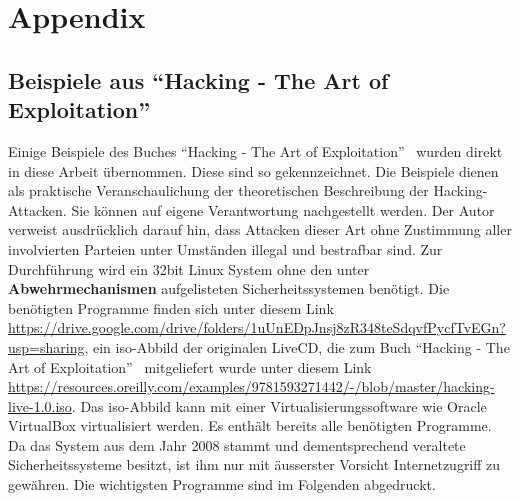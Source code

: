 \documentclass[11pt, a4paper]{article}
\begin{document}
\section{Appendix}
\subsection{Beispiele aus ``Hacking - The Art of Exploitation''}\label{subsec:beispiele}
Einige Beispiele des Buches ``Hacking - The Art of Exploitation''~\cite{erickson2008hacking} wurden direkt in diese Arbeit übernommen. Diese sind so gekennzeichnet. Die Beispiele dienen als praktische Veranschaulichung der theoretischen Beschreibung der Hacking-Attacken. Sie können auf eigene Verantwortung nachgestellt werden. Der Autor verweist ausdrücklich darauf hin, dass Attacken dieser Art ohne Zustimmung aller involvierten Parteien unter Umständen illegal und bestrafbar sind. Zur Durchführung wird ein 32bit Linux System ohne den unter \textbf{Abwehrmechanismen} aufgelisteten Sicherheitssystemen benötigt. Die benötigten Programme finden sich unter diesem Link \url{https://drive.google.com/drive/folders/1uUnEDpJnsj8zR348teSdqvfPycfTvEGn?usp=sharing}, ein \gls{iso}-Abbild der originalen LiveCD, die zum Buch ``Hacking - The Art of Exploitation''~\cite{erickson2008hacking} mitgeliefert wurde unter diesem Link \url{https://resources.oreilly.com/examples/9781593271442/-/blob/master/hacking-live-1.0.iso}. Das \gls{iso}-Abbild kann mit einer Virtualisierungssoftware wie Oracle VirtualBox virtualisiert werden. Es enthält bereits alle benötigten Programme. Da das System aus dem Jahr 2008 stammt und dementsprechend veraltete Sicherheitssysteme besitzt, ist ihm nur mit äusserster Vorsicht Internetzugriff zu gewähren. Die wichtigsten Programme sind im Folgenden abgedruckt.
\end{document}
